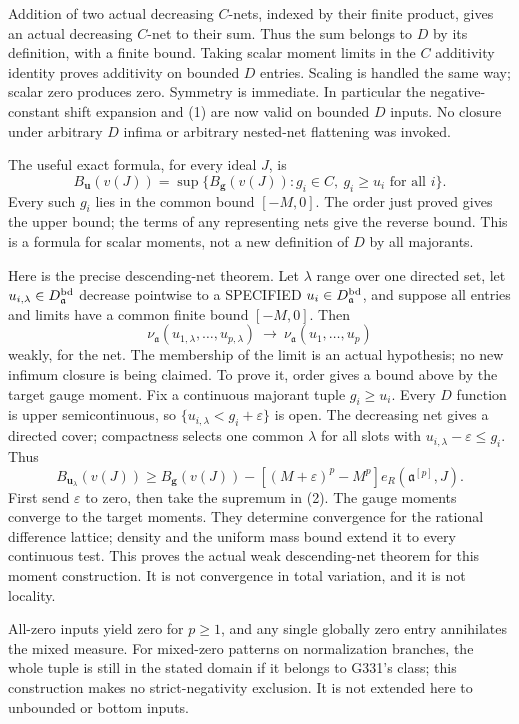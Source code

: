 \documentclass[
  11pt,
]{article}
\begin{document}
Addition of two actual decreasing \(C\)-nets, indexed by their finite
product, gives an actual decreasing \(C\)-net to their sum. Thus the sum
belongs to \(D\) by its definition, with a finite bound. Taking scalar
moment limits in the \(C\) additivity identity proves additivity on
bounded \(D\) entries. Scaling is handled the same way; scalar zero
produces zero. Symmetry is immediate. In particular the
negative-constant shift expansion and (1) are now valid on bounded \(D\)
inputs. No closure under arbitrary \(D\) infima or arbitrary nested-net
flattening was invoked.

The useful exact formula, for every ideal \(J\), is
\[B_{\boldsymbol u}(v(J))=\sup\{B_{\boldsymbol g}(v(J)):g_i\in C,\ g_i\ge u_i\text{ for all }i\}.\tag{2}\]
Every such \(g_i\) lies in the common bound \([-M,0]\). The order just
proved gives the upper bound; the terms of any representing nets give
the reverse bound. This is a formula for scalar moments, not a new
definition of \(D\) by all majorants.

Here is the precise descending-net theorem. Let \(\lambda\) range over
one directed set, let \(u_{i,\lambda}\in D^{\rm bd}_{\mathfrak a}\)
decrease pointwise to a SPECIFIED \(u_i\in D^{\rm bd}_{\mathfrak a}\),
and suppose all entries and limits have a common finite bound
\([-M,0]\). Then
\[\nu_{\mathfrak a}(u_{1,\lambda},\ldots,u_{p,\lambda})\ \longrightarrow\ \nu_{\mathfrak a}(u_1,\ldots,u_p)\]
weakly, for the net. The membership of the limit is an actual
hypothesis; no new infimum closure is being claimed. To prove it, order
gives a bound above by the target gauge moment. Fix a continuous
majorant tuple \(g_i\ge u_i\). Every \(D\) function is upper
semicontinuous, so \(\{u_{i,\lambda}<g_i+\varepsilon\}\) is open. The
decreasing net gives a directed cover; compactness selects one common
\(\lambda\) for all slots with \(u_{i,\lambda}-\varepsilon\le g_i\).
Thus
\[B_{\boldsymbol u_\lambda}(v(J))\ge B_{\boldsymbol g}(v(J))-[(M+\varepsilon)^p-M^p]e_R(\mathfrak a^{[p]},J).\]
First send \(\varepsilon\) to zero, then take the supremum in (2). The
gauge moments converge to the target moments. They determine convergence
for the rational difference lattice; density and the uniform mass bound
extend it to every continuous test. This proves the actual weak
descending-net theorem for this moment construction. It is not
convergence in total variation, and it is not locality.

All-zero inputs yield zero for \(p\ge1\), and any single globally zero
entry annihilates the mixed measure. For mixed-zero patterns on
normalization branches, the whole tuple is still in the stated domain if
it belongs to G331's class; this construction makes no strict-negativity
exclusion. It is not extended here to unbounded or bottom inputs.
\end{document}

